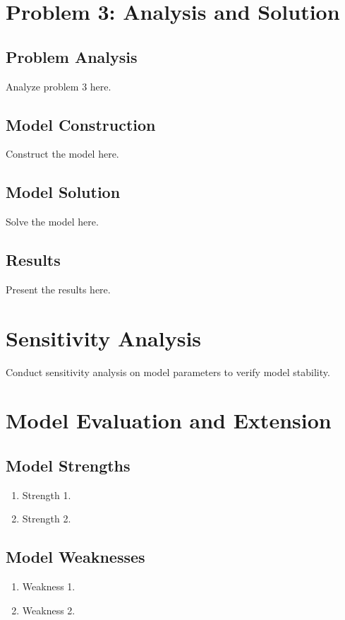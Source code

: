 \documentclass[mcmthesis]{mcmthesis}
\begin{document}
\section{Problem 3: Analysis and Solution}
\subsection{Problem Analysis}
Analyze problem 3 here.

\subsection{Model Construction}
Construct the model here.

\subsection{Model Solution}
Solve the model here.

\subsection{Results}
Present the results here.

\section{Sensitivity Analysis}
Conduct sensitivity analysis on model parameters to verify model stability.

\section{Model Evaluation and Extension}
\subsection{Model Strengths}
\begin{enumerate}
    \item Strength 1.
    \item Strength 2.
\end{enumerate}

\subsection{Model Weaknesses}
\begin{enumerate}
    \item Weakness 1.
    \item Weakness 2.
\end{enumerate}
\end{document}
